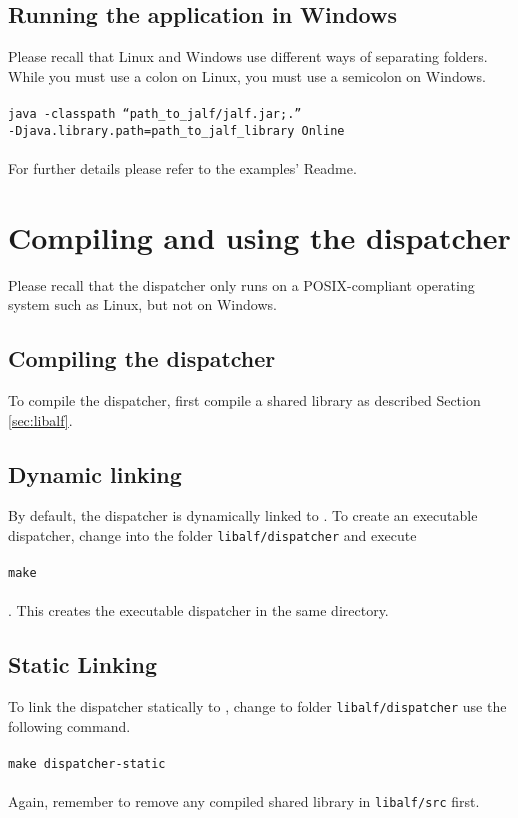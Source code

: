 \subsection*{Running the application in Windows}
Please recall that Linux and Windows use different ways of separating folders. While you must use a colon on Linux, you must use a semicolon on Windows. 
\\ \\
\texttt{java -classpath ``path\_to\_jalf/jalf.jar;.'' \\ \hspace*{25pt} -Djava.library.path=path\_to\_jalf\_library Online}
\\ \\
For further details please refer to the examples’ Readme.

\section{Compiling and using the dispatcher}
Please recall that the dispatcher only runs on a POSIX-compliant operating system such as Linux, but not on Windows.

\subsection{Compiling the dispatcher}
To compile the dispatcher, first compile a shared \libalf library as described Section \ref{sec:libalf}.
\subsection*{Dynamic linking}
By default, the dispatcher is dynamically linked to \libalf. To create an executable dispatcher, change into the folder \texttt{libalf/dispatcher} and execute \\ \\ \texttt{make} \\ \\. This creates the executable dispatcher in the same directory. 
\subsection*{Static Linking}
To link the dispatcher statically to \libalf, change to folder \texttt{libalf/dispatcher} use the following command.
\\ \\ 
\texttt{make dispatcher-static}
\\ \\
Again, remember to remove any compiled shared library in \texttt{libalf/src} first.

